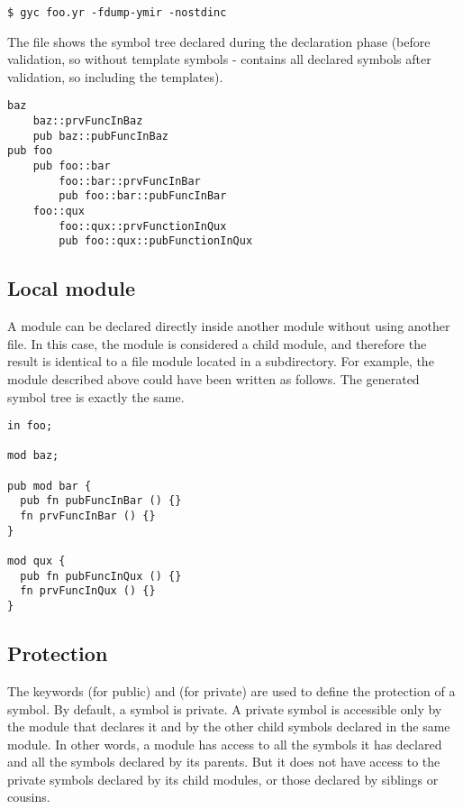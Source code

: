 \begin{lstlisting}[style=intermediateVerb]
$ gyc foo.yr -fdump-ymir -nostdinc
\end{lstlisting}

The file  shows the symbol tree declared during the
declaration phase (before validation, so without template symbols -
 contains all declared symbols after validation, so
including the templates).

\begin{lstlisting}[style=intermediateVerb]
baz
    baz::prvFuncInBaz
    pub baz::pubFuncInBaz
pub foo
    pub foo::bar
        foo::bar::prvFuncInBar
        pub foo::bar::pubFuncInBar
    foo::qux
        foo::qux::prvFunctionInQux
        pub foo::qux::pubFunctionInQux
\end{lstlisting}

\subsection{Local module}

A module can be declared directly inside another module without using another
file. In this case, the module is considered a child module, and therefore the
result is identical to a file module located in a subdirectory. For example, the
 module described above could have been written as follows. The
generated symbol tree is exactly the same.

\begin{lstlisting}[caption=\textit{./foo.yr}, style=coloredverbatim]
in foo;

mod baz;

pub mod bar {
  pub fn pubFuncInBar () {}
  fn prvFuncInBar () {}
}

mod qux {
  pub fn pubFuncInQux () {}
  fn prvFuncInQux () {}
}
\end{lstlisting}

\subsection{Protection}

The keywords  (for public) and  (for private) are used
to define the protection of a symbol. By default, a symbol is private. A private
symbol is accessible only by the module that declares it and by the other child
symbols declared in the same module. In other words, a module has access to all
the symbols it has declared and all the symbols declared by its parents. But it
does not have access to the private symbols declared by its child modules, or
those declared by siblings or cousins.

